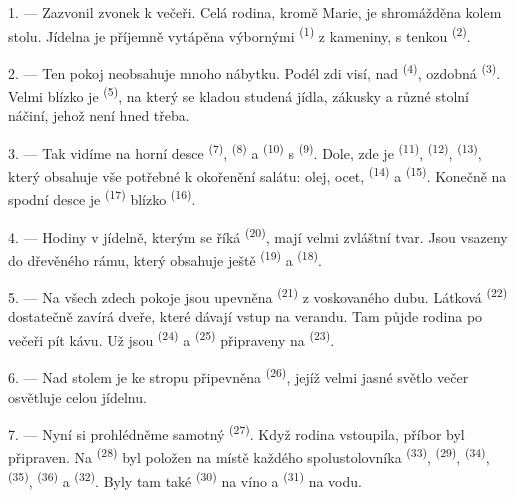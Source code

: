 \VUsaut{3.6mm}
\VUsaut{3.0mm}

1. --- Zazvonil zvonek k večeři. Celá rodina, kromě Marie, je shromážděna kolem stolu. Jídelna
je příjemně vytápěna výbornými  \textsuperscript{(1)} z kameniny, s tenkou
 \textsuperscript{(2)}.

2. --- Ten pokoj neobsahuje mnoho nábytku. Podél zdi visí, nad 
\textsuperscript{(4)}, ozdobná  \textsuperscript{(3)}. Velmi blízko je
 \textsuperscript{(5)}, na který se kladou studená jídla, zákusky a
různé stolní náčiní, jehož není hned třeba.

3. --- Tak vidíme na horní desce  \textsuperscript{(7)},
 \textsuperscript{(8)} a  \textsuperscript{(10)} s
 \textsuperscript{(9)}. Dole, zde je 
\textsuperscript{(11)},  \textsuperscript{(12)}, 
\textsuperscript{(13)}, který obsahuje vše potřebné k okořenění salátu: olej, ocet,
 \textsuperscript{(14)} a  \textsuperscript{(15)}. Konečně na spodní
desce je  \textsuperscript{(17)} blízko 
\textsuperscript{(16)}.

4. --- Hodiny v jídelně, kterým se říká  \textsuperscript{(20)}, mají
velmi zvláštní tvar. Jsou vsazeny do dřevěného rámu, který obsahuje ještě 
\textsuperscript{(19)} a  \textsuperscript{(18)}.

\VUsaut{4.6mm}
\VUsaut{3.0mm}

5. --- Na všech zdech pokoje jsou upevněna  \textsuperscript{(21)} z
voskovaného dubu. Látková  \textsuperscript{(22)} dostatečně zavírá
dveře, které dávají vstup na verandu. Tam půjde rodina po večeři pít kávu. Už jsou
 \textsuperscript{(24)} a
 \textsuperscript{(25)} připraveny na 
\textsuperscript{(23)}.

6. --- Nad stolem je ke stropu připevněna  \textsuperscript{(26)}, jejíž
velmi jasné světlo večer osvětluje celou jídelnu.

7. --- Nyní si prohlédněme samotný  \textsuperscript{(27)}. Když rodina
vstoupila, příbor byl připraven. Na  \textsuperscript{(28)} byl položen na
místě každého spolustolovníka  \textsuperscript{(33)},
 \textsuperscript{(29)},  \textsuperscript{(34)},
 \textsuperscript{(35)},  \textsuperscript{(36)} a
 \textsuperscript{(32)}. Byly tam také 
\textsuperscript{(30)} na víno a  \textsuperscript{(31)} na vodu.

